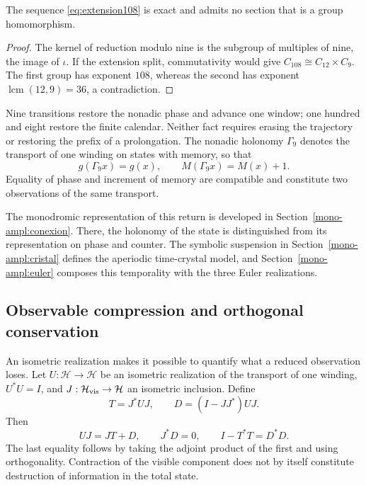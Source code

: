 \begin{proposition}
The sequence \eqref{eq:extension108} is exact and admits no section that is a group homomorphism.
\end{proposition}
\begin{proof}
The kernel of reduction modulo nine is the subgroup of multiples of nine, the image of \(\iota\). If the extension split, commutativity would give \(C_{108}\cong C_{12}\times C_9\). The first group has exponent \(108\), whereas the second has exponent \(\operatorname{lcm}(12,9)=36\), a contradiction.
\end{proof}

Nine transitions restore the nonadic phase and advance one window; one hundred and eight restore the finite calendar. Neither fact requires erasing the trajectory or restoring the prefix of a prolongation. The nonadic holonomy \(\Gamma_9\) denotes the transport of one winding on states with memory, so that
\begin{equation}
 g(\Gamma_9x)=g(x),\qquad M(\Gamma_9x)=M(x)+1.
 \label{eq:holonomia-memoria}
\end{equation}
Equality of phase and increment of memory are compatible and constitute two observations of the same transport.



The monodromic representation of this return is developed in
Section~\ref{mono-ampl:conexion}. There, the holonomy of the
state is distinguished from its representation on phase and counter. The symbolic
suspension in Section~\ref{mono-ampl:cristal} defines the aperiodic
time-crystal model, and Section~\ref{mono-ampl:euler}
composes this temporality with the three Euler realizations.

\subsection{Observable compression and orthogonal conservation}

An isometric realization makes it possible to quantify what a reduced observation loses. Let \(U:\mathcal H\to\mathcal H\) be an isometric realization of the transport of one winding, \(U^*U=I\), and \(J:\mathcal H_{\rm vis}\to\mathcal H\) an isometric inclusion. Define
\[
 T=J^*UJ,\qquad D=(I-JJ^*)UJ.
\]
Then
\begin{equation}
 UJ=JT+D,\qquad J^*D=0,\qquad I-T^*T=D^*D.
 \label{eq:conservacion-ortogonal}
\end{equation}
The last equality follows by taking the adjoint product of the first and using orthogonality. Contraction of the visible component does not by itself constitute destruction of information in the total state.

